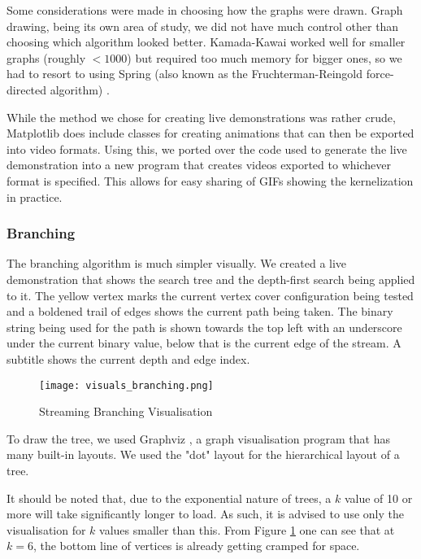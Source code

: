 Some considerations were made in choosing how the graphs were drawn. Graph
drawing, being its own area of study, we did not have much control other than
choosing which algorithm looked better. Kamada-Kawai \cite{kamada1989drawing}
worked well for smaller graphs (roughly $< 1000$) but required too much memory
for bigger ones, so we had to resort to using Spring (also known as the
Fruchterman-Reingold force-directed algorithm) \cite{fruchterman1991graph}.

While the method we chose for creating live demonstrations was rather crude,
Matplotlib does include classes for creating animations that can then be
exported into video formats. Using this, we ported over the code used to
generate the live demonstration into a new program that creates videos exported
to whichever format is specified. This allows for easy sharing of GIFs showing
the kernelization in practice.

\subsubsection{Branching}

The branching algorithm is much simpler visually. We created a live
demonstration that shows the search tree and the depth-first search being
applied to it. The yellow vertex marks the current vertex cover configuration
being tested and a boldened trail of edges shows the current path being taken.
The binary string being used for the path is shown towards the top left with an
underscore under the current binary value, below that is the current edge of
the stream. A subtitle shows the current depth and edge index.

\begin{figure}[htb]
    \centering
    \texttt{[image: visuals\_branching.png]}
    \caption{Streaming Branching Visualisation}
    \label{fig:branching_visualisation}
\end{figure}

To draw the tree, we used Graphviz \cite{ellson2003graphviz}, a graph
visualisation program that has many built-in layouts. We used the "dot" layout
for the hierarchical layout of a tree.

It should be noted that, due to the exponential nature of trees, a \(k\) value
of 10 or more will take significantly longer to load. As such, it is advised to
use only the visualisation for \(k\) values smaller than this. From Figure
\ref{fig:branching_visualisation} one can see that at \(k=6\), the bottom line
of vertices is already getting cramped for space.

